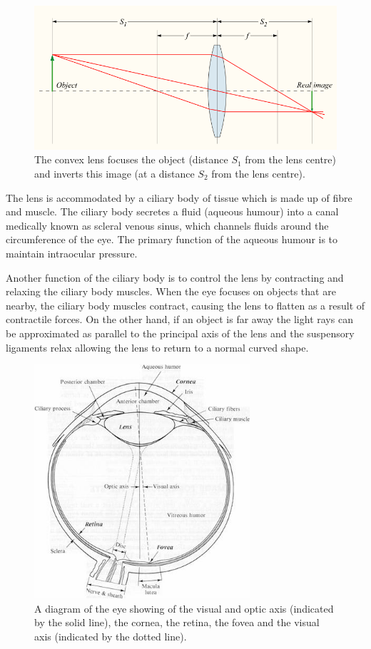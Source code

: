 \begin{figure}[H]
\centering
  \includegraphics{figures/convergent_lens2}
\caption{The convex lens focuses the object (distance $S_1$ from the lens centre)
         and inverts this image (at a distance $S_2$ from the lens centre).
         \cite{greivenkamp2004field}}
\label{fig:convergent_lens}
\end{figure}

The lens is accommodated by a ciliary body of tissue which is made up of fibre and
muscle. The ciliary body secretes a fluid (aqueous humour) into a canal medically
known as scleral venous sinus, which channels fluids around the circumference of the
eye.\cite{bill1970effects,dvorak1934schlemm} The primary function of the aqueous
humour is to maintain intraocular pressure.

Another function of the ciliary body is to control the lens by contracting and relaxing the
ciliary body muscles. When the eye focuses on objects that are nearby, the ciliary body
muscles contract, causing the lens to flatten as a result of contractile forces. On the
other hand, if an  object is far away the light rays can be approximated as parallel to the
principal axis of the lens and the suspensory ligaments relax allowing the lens to return
to a normal curved shape.

\begin{figure}[H]
\centering
  \includegraphics[width=8cm]{figures/eye_diagram}
\caption{A diagram of the eye showing of the visual
 	     and optic axis (indicated by the solid line), the cornea, the retina, the fovea
              and the visual axis (indicated by the dotted line).}
\label{fig:optic_axis}
\end{figure}

